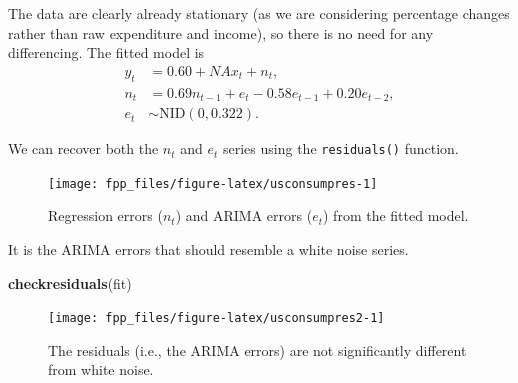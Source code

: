 \documentclass[]{book}
\newenvironment{Shaded}{\begin{snugshade}}{\end{snugshade}}
\newcommand{\DataTypeTok}[1]{\textcolor[rgb]{0.13,0.29,0.53}{#1}}
\newcommand{\KeywordTok}[1]{\textcolor[rgb]{0.13,0.29,0.53}{\textbf{#1}}}
\newcommand{\NormalTok}[1]{#1}
\newcommand{\OperatorTok}[1]{\textcolor[rgb]{0.81,0.36,0.00}{\textbf{#1}}}
\newcommand{\OtherTok}[1]{\textcolor[rgb]{0.56,0.35,0.01}{#1}}
\newcommand{\StringTok}[1]{\textcolor[rgb]{0.31,0.60,0.02}{#1}}
\begin{document}
The data are clearly already stationary (as we are considering percentage changes rather than raw expenditure and income), so there is no need for any differencing. The fitted model is
\begin{align*}
  y_t &= 0.60 +
         NA x_t + n_t, \\
  n_t &= 0.69 n_{t-1} + e_t
        -0.58 e_{t-1} +
        0.20 e_{t-2},\\
  e_t &\sim \text{NID}(0,0.322).
\end{align*}

We can recover both the \(n_t\) and \(e_t\) series using the \texttt{residuals()} function.

\begin{Shaded}
\end{Shaded}

\begin{figure}

{\centering \texttt{[image: fpp\_files/figure-latex/usconsumpres-1]} 

}

\caption{Regression errors ($n_t$) and ARIMA errors ($e_t$) from the fitted model.}\label{fig:usconsumpres}
\end{figure}

It is the ARIMA errors that should resemble a white noise series.

\begin{Shaded}
\begin{Highlighting}[]
\KeywordTok{checkresiduals}\NormalTok{(fit)}
\end{Highlighting}
\end{Shaded}

\begin{figure}

{\centering \texttt{[image: fpp\_files/figure-latex/usconsumpres2-1]} 

}

\caption{The residuals (i.e., the ARIMA errors) are not significantly different from white noise.}\label{fig:usconsumpres2}
\end{figure}
\end{document}
